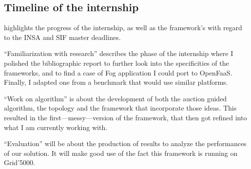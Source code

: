 \subsection{Timeline of the internship}

 highlights the progress of the internship, as well as the framework's with regard to the INSA and SIF master deadlines.

\begin{description}
	\item{“Familiarization with research”} describes the phase of the internship where I polished the bibliographic report to further look into the specificities of the frameworks, and to find a case of Fog application I could port to OpenFaaS. Finally, I adapted one from a benchmark that would use similar platforms.
	\item{“Work on algorithm”} is about the development of both the auction guided algorithm, the topology and the framework that incorporate those ideas. This resulted in the first—messy—version of the framework, that then got refined into what I am currently working with.
	\item{“Evaluation”} will be about the production of results to analyze the performances of our solution. It will make good use of the fact this framework is running on Grid'5000.
\end{description}

